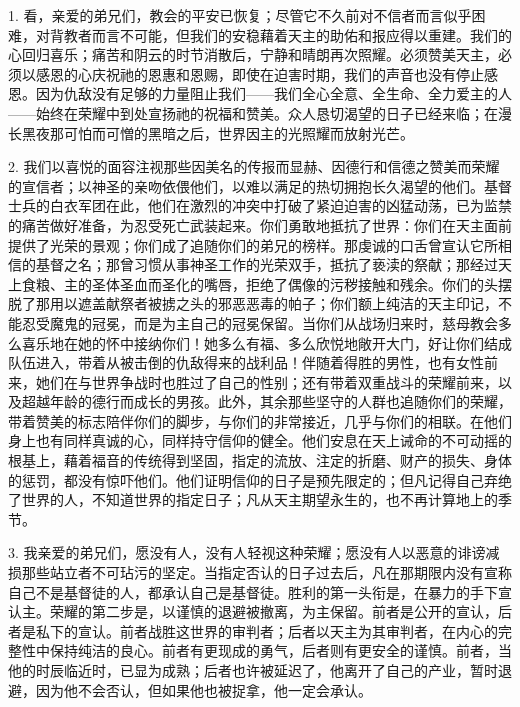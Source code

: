 1. 看，亲爱的弟兄们，教会的平安已恢复；尽管它不久前对不信者而言似乎困难，对背教者而言不可能，但我们的安稳藉着天主的助佑和报应得以重建。我们的心回归喜乐；痛苦和阴云的时节消散后，宁静和晴朗再次照耀。必须赞美天主，必须以感恩的心庆祝祂的恩惠和恩赐，即使在迫害时期，我们的声音也没有停止感恩。因为仇敌没有足够的力量阻止我们——我们全心全意、全生命、全力爱主的人——始终在荣耀中到处宣扬祂的祝福和赞美。众人恳切渴望的日子已经来临；在漫长黑夜那可怕而可憎的黑暗之后，世界因主的光照耀而放射光芒。\par

2. 我们以喜悦的面容注视那些因美名的传报而显赫、因德行和信德之赞美而荣耀的宣信者；以神圣的亲吻依偎他们，以难以满足的热切拥抱长久渴望的他们。基督士兵的白衣军团在此，他们在激烈的冲突中打破了紧迫迫害的凶猛动荡，已为监禁的痛苦做好准备，为忍受死亡武装起来。你们勇敢地抵抗了世界：你们在天主面前提供了光荣的景观；你们成了追随你们的弟兄的榜样。那虔诚的口舌曾宣认它所相信的基督之名；那曾习惯从事神圣工作的光荣双手，抵抗了亵渎的祭献；那经过天上食粮、主的圣体圣血而圣化的嘴唇，拒绝了偶像的污秽接触和残余。你们的头摆脱了那用以遮盖献祭者被掳之头的邪恶恶毒的帕子；你们额上纯洁的天主印记，不能忍受魔鬼的冠冕，而是为主自己的冠冕保留。当你们从战场归来时，慈母教会多么喜乐地在她的怀中接纳你们！她多么有福、多么欣悦地敞开大门，好让你们结成队伍进入，带着从被击倒的仇敌得来的战利品！伴随着得胜的男性，也有女性前来，她们在与世界争战时也胜过了自己的性别；还有带着双重战斗的荣耀前来，以及超越年龄的德行而成长的男孩。此外，其余那些坚守的人群也追随你们的荣耀，带着赞美的标志陪伴你们的脚步，与你们的非常接近，几乎与你们的相联。在他们身上也有同样真诚的心，同样持守信仰的健全。他们安息在天上诫命的不可动摇的根基上，藉着福音的传统得到坚固，指定的流放、注定的折磨、财产的损失、身体的惩罚，都没有惊吓他们。他们证明信仰的日子是预先限定的；但凡记得自己弃绝了世界的人，不知道世界的指定日子；凡从天主期望永生的，也不再计算地上的季节。\par

3. 我亲爱的弟兄们，愿没有人，没有人轻视这种荣耀；愿没有人以恶意的诽谤减损那些站立者不可玷污的坚定。当指定否认的日子过去后，凡在那期限内没有宣称自己不是基督徒的人，都承认自己是基督徒。胜利的第一头衔是，在暴力的手下宣认主。荣耀的第二步是，以谨慎的退避被撤离，为主保留。前者是公开的宣认，后者是私下的宣认。前者战胜这世界的审判者；后者以天主为其审判者，在内心的完整性中保持纯洁的良心。前者有更现成的勇气，后者则有更安全的谨慎。前者，当他的时辰临近时，已显为成熟；后者也许被延迟了，他离开了自己的产业，暂时退避，因为他不会否认，但如果他也被捉拿，他一定会承认。\par

